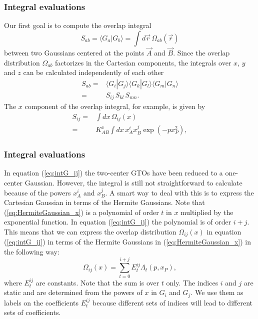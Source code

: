 \frame
{
  \frametitle{Integral evaluations}
\begin{small}
{\scriptsize
Our first goal is to compute the overlap integral
\begin{equation}
S_{ab}  = \langle G_a|G_b\rangle = \int d\vec r \,\Omega_{ab}(\vec r)
\end{equation}
between two Gaussians centered at the points $\vec A$ and $\vec B$.
Since the overlap distribution $\Omega_{ab}$ factorizes in the Cartesian components, the integrals over $x$, $y$ and $z$ can be calculated independently of each other
\begin{equation}
\begin{split}
 S_{ab} = & \langle G_i|G_j\rangle \langle G_k|G_l\rangle \langle G_m|G_n\rangle \\
        = & S_{ij}\,S_{kl}\,S_{mn}.
\end{split}
\end{equation}
The $x$ component of the overlap integral, for example, is given by
\begin{equation}
\label{eq:intG_ij}
\begin{split}
 S_{ij} = & \int dx \,\Omega_{ij}(x) \\
        = & K_{AB}^x\int dx \,x_A^ix_B^j\exp(-px_P^2),
\end{split}
\end{equation}

}
\end{small}
}
\frame
{
  \frametitle{Integral evaluations}
\begin{small}
{\scriptsize
In equation (\ref{eq:intG_ij}) the two-center GTOs have been reduced to a one-center Gaussian.
However, the integral is still not straightforward to calculate because of the powers $x_A^i$ and $x_B^j$. A smart way to deal with this is to express the Cartesian Gaussian
in terms of the Hermite Gaussians. Note that (\ref{eq:HermiteGaussian_x}) is a polynomial of order $t$ in $x$ multiplied by the exponential function. In equation (\ref{eq:intG_ij}) the polynomial
is of order $i+j$. This means that we can express the overlap distribution $\Omega_{ij}(x)$ in equation (\ref{eq:intG_ij}) in terms of the Hermite Gaussians in (\ref{eq:HermiteGaussian_x}) in the following way:
\begin{equation}
\label{eq:LinCombOfHermGauss}
 \Omega_{ij}(x) = \sum_{t=0}^{i+j} E^{ij}_t \Lambda_t(p, x_P),
\end{equation}
where $E^{ij}_t$ are constants.
Note that the sum is over $t$ only. The indices $i$ and $j$ are static and are determined from the powers of $x$ in $G_i$ and $G_j$.
We use them as labels on the coefficients $E^{ij}_t$ because different sets of indices will lead to different sets of coefficients.
}
\end{small}
}
